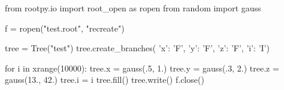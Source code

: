 \begin{footnotesize}
\begin{pyglist}[language=python,texcl=true,abovecaptionskip=0,style=vs,bgcolor=Moccasin]
from rootpy.io import root_open as ropen
from random import gauss

f = ropen("test.root", "recreate")

tree = Tree("test")
tree.create_branches(
        {'x': 'F',
         'y': 'F',
         'z': 'F',
         'i': 'I'})

for i in xrange(10000):
    tree.x = gauss(.5, 1.)
    tree.y = gauss(.3, 2.)
    tree.z = gauss(13., 42.)
    tree.i = i
    tree.fill()
tree.write()
f.close()
\end{pyglist}
\end{footnotesize}
